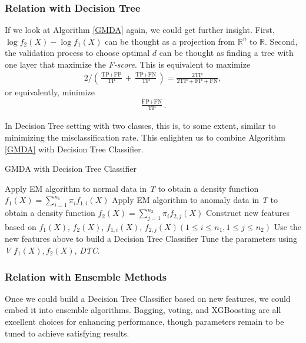 \documentclass[english]{article}
\newenvironment{eqt}{\begin{equation}\begin{aligned}}{\end{aligned}\end{equation}}
\begin{document}
\subsubsection{Relation with Decision Tree}
\par

If we look at Algorithm \ref{GMDA} again, we could get further insight. First, $\log f_2(X) - \log f_1(X)$ can be thought as a projection from $\mathbb{R}^n$ to $\mathbb{R}$. Second, the validation process to choose optimal $d$ can be thought as finding a tree with one layer that maximize the \textit{F-score}. This is equivalent to maximize 
\begin{eqt}
2\bigg/\left(\frac{\text{TP}+\text{FP}}{\text{TP}}+\frac{\text{TP}+\text{FN}}{\text{TP}}\right) = \frac{2\text{TP}}{2\text{TP}+\text{FP}+\text{FN}},
\end{eqt}
or equivalently, minimize
\begin{eqt}
\frac{\text{FP} + \text{FN}}{\text{TP}}.
\end{eqt}
\par
In Decision Tree setting with two classes, this is, to some extent, similar to minimizing the misclassification rate. This enlighten us to combine Algorithm \ref{GMDA} with Decision Tree Classifier.

\begin{algorithm}[H]
\label{GMDA-DTC}
\caption{GMDA with Decision Tree Classifier}
\SetAlgoLined
		Apply EM algorithm to normal data in \textit{T} to obtain a density function $f_1(X) = \sum_{i=1}^{n_1}\pi_if_{1, i}(X)$\;
		Apply EM algorithm to anomaly data in \textit{T} to obtain a density function $f_2(X) = \sum_{j=1}^{n_2}\pi_if_{2, j}(X)$\;
		Construct new features based on $f_1(X)$, $f_2(X)$, $f_{1, i}(X)$, $f_{2, j}(X)$$(1\leqslant i\leqslant n_1, 1\leqslant j\leqslant n_2)$\;
		Use the new features above to build a Decision Tree Classifier\;
		Tune the parameters using \textit{V}\;
		\Return $f_1(X), f_2(X)$, \textit{DTC}.
\end{algorithm}

\subsubsection{Relation with Ensemble Methods}
\par Once we could build a Decision Tree Classifier based on new features, we could embed it into ensemble algorithms. Bagging, voting, and XGBoosting are all excellent choices for enhancing performance, though parameters remain to be tuned to achieve satisfying results.
\end{document}
